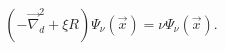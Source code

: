 \begin{equation}
\left(-\vec{\nabla }_{d}^{2}+\xi R\right)\Psi _{\nu }\left(\vec{x}\right)=\nu \Psi _{\nu }\left(\vec{x}\right).\end{equation}

